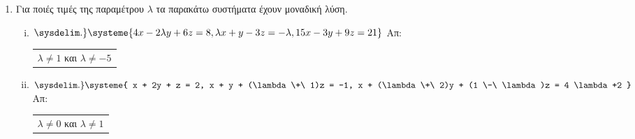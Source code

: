 \documentclass[a4paper,table]{report}
\begin{document}
\begin{center}
  \minibox{\large \bfseries \textcolor{Col1}{Ασκήσεις στα παραμετρικά  συστήματα}}
\end{center}

\vspace{\baselineskip}

\begin{enumerate}
  \setlength{\itemsep}{\baselineskip}
\item Για ποιές τιμές της παραμέτρου $ \lambda $ τα παρακάτω συστήματα έχουν 
  μοναδική λύση.

  \begin{enumerate}[i)]
    \setlength{\itemsep}{\baselineskip}
  \item $\sysdelim.\} \systeme{4x-2\lambda y + 6z = 8, \lambda x + y -3z = -\lambda, 15x -3y + 9z = 21
  } $ \hfill Απ: \begin{tabular}{l}
    $\lambda \neq 1$ και $ \lambda \neq -5 $
  \end{tabular}


\item $ \sysdelim.\} \systeme{
  x + 2y + z = 2, 
  x + y + (\lambda  \+\ 1)z = -1, 
  x + (\lambda  \+\ 2)y + (1 \-\ \lambda)z = 4 \lambda +2
} $ \hfill Απ: \begin{tabular}{l}
    $\lambda \neq 0$ και $ \lambda \neq 1 $
\end{tabular} 
\end{enumerate}
\end{enumerate}
\end{document}
